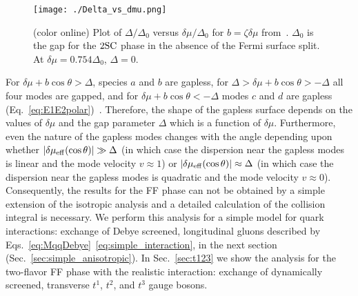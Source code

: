 \documentclass[10pt, aps, prd, superscriptaddress, nofootinbib, 
               amsmath, amssymb, twocolumn,
               preprintnumbers, showpacs,
               raggedbottom,
               floatfix]{revtex4-1}
\newcommand{\dmu}{{\delta\mu}}
\newcommand{\SC}{{\rm{SC}}}
\begin{document}
\begin{figure}[tbp]
\texttt{[image: ./Delta\_vs\_dmu.png]}
  \caption{(color online) Plot of $\Delta/\Delta_{0}$ versus $\dmu/\Delta_{0}$
  for $b=\zeta\delta\mu$ from~\cite{Mannarelli:2006}.  $\Delta_{0}$ is the gap
  for the $2\SC$ phase in the absence of the Fermi surface split. At
  $\delta\mu=0.754\Delta_{0}$, $\Delta=0$. 
  ~\label{fig:Delta_vs_dmu}
}
\end{figure}

For $\delta\mu +b \cos\theta>\Delta$, species $a$ and $b$ are gapless, for
$\Delta>\delta\mu +b \cos\theta>-\Delta$ all four modes are gapped, and for
$\delta\mu +b \cos\theta<-\Delta$ modes $c$ and $d$ are gapless
(Eq.~\ref{eq:E1E2polar})~\cite{Alford:2000ze,Bowers:2003ye}. Therefore, the
shape of the gapless surface depends on the values of $\delta\mu$ and the gap
parameter $\Delta$ which is a function of $\delta\mu$. Furthermore,
even the nature of the gapless modes changes with the angle depending upon
whether $|\delta\mu_{\rm{eff}}(\cos\theta)|\gg \Delta$ (in which case the
dispersion near the gapless modes is linear and the mode velocity $v\approx 1$)
or $|\delta\mu_{\rm{eff}}(\cos\theta)|\approx \Delta$ (in which case the
dispersion near the gapless modes is quadratic and the mode velocity $v\approx
0$). Consequently, the results for the FF phase can not be obtained by a simple
extension of the isotropic analysis and a detailed calculation of the collision
integral is necessary. We perform this analysis for a simple model for quark
interactions: exchange of Debye screened, longitudinal gluons described by
Eqs.~\ref{eq:MqqDebye}~\ref{eq:simple_interaction}, in the next section
(Sec.~\ref{sec:simple_anisotropic}). In Sec.~\ref{sec:t123} we show the
analysis for the two-flavor FF phase with the realistic interaction: exchange
of dynamically screened, transverse $t^1$, $t^2$, and $t^3$ gauge bosons.
\end{document}
